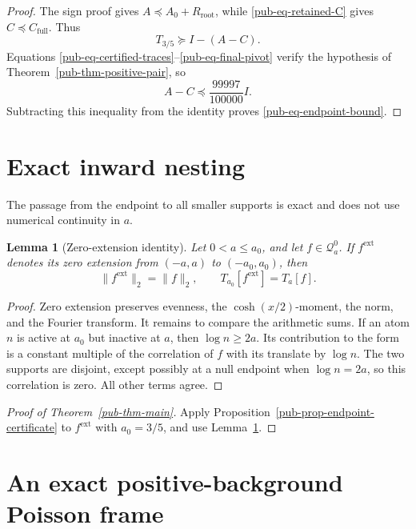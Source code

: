 \documentclass[11pt]{article}
\newtheorem{lemma}[theorem]{Lemma}
\theoremstyle{remark}
\begin{document}
\begin{proof}
The sign proof gives \(A\preceq A_0+R_{\mathrm{root}}\),
while \eqref{pub-eq-retained-C} gives \(C\preceq C_{\mathrm{full}}\).
Thus
\[
 T_{3/5}\succeq I-(A-C).
\]
Equations \eqref{pub-eq-certified-traces}--\eqref{pub-eq-final-pivot} verify the hypothesis of Theorem~\ref{pub-thm-positive-pair}, so
\[
 A-C\preceq\frac{99997}{100000}I.
\]
Subtracting this inequality from the identity proves \eqref{pub-eq-endpoint-bound}.
\end{proof}

\section{Exact inward nesting}
\label{pub-sec-nesting}

The passage from the endpoint to all smaller supports is exact and does not use numerical continuity in \(a\).

\begin{lemma}[Zero-extension identity]
\label{pub-lem-zero-extension}
Let \(0<a\leq a_0\), and let \(f\in\mathcal Q_a^0\).
If \(f^{\mathrm{ext}}\) denotes its zero extension from \((-a,a)\) to \((-a_0,a_0)\), then
\begin{equation}
 \lVert f^{\mathrm{ext}}\rVert_2=\lVert f\rVert_2,
 \qquad
 T_{a_0}[f^{\mathrm{ext}}]=T_a[f].
\label{pub-eq-zero-extension-identity}
\end{equation}
\end{lemma}

\begin{proof}
Zero extension preserves evenness, the \(\cosh(x/2)\)-moment, the norm, and the Fourier transform.
It remains to compare the arithmetic sums.
If an atom \(n\) is active at \(a_0\) but inactive at \(a\), then \(\log n\geq2a\).
Its contribution to the form is a constant multiple of the correlation of \(f\) with its translate by \(\log n\).
The two supports are disjoint, except possibly at a null endpoint when \(\log n=2a\),
so this correlation is zero.
All other terms agree.
\end{proof}

\begin{proof}[Proof of Theorem~\ref{pub-thm-main}]
Apply Proposition~\ref{pub-prop-endpoint-certificate} to \(f^{\mathrm{ext}}\) with \(a_0=3/5\),
and use Lemma~\ref{pub-lem-zero-extension}.
\end{proof}

\section{An exact positive-background Poisson frame}
\label{pub-sec-poisson-frame}
\end{document}

